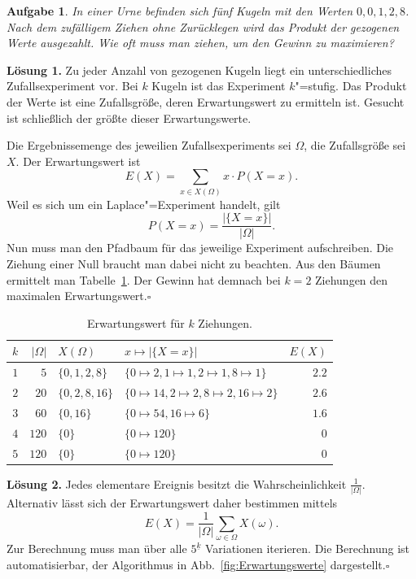 \documentclass[a4paper,10pt,fleqn,twoside]{scrartcl}
\numberwithin{equation}{section}
\newcommand{\strong}[1]{{\normalfont\sffamily\bfseries #1}}
\renewcommand{\qedsymbol}{\ensuremath{\square}}
\theoremstyle{Aufgabe}
\newtheorem{Aufgabe}{\sffamily Aufgabe}[section]
\begin{document}
\begin{Aufgabe}
In einer Urne befinden sich fünf Kugeln mit den Werten $0,0,1,2,8$.
Nach dem zufälligem Ziehen ohne Zurücklegen wird das Produkt der
gezogenen Werte ausgezahlt. Wie oft muss man ziehen, um den Gewinn zu
maximieren?
\end{Aufgabe}
\strong{Lösung 1.} Zu jeder Anzahl von gezogenen Kugeln liegt ein
unterschiedliches Zufallsexperiment vor. Bei $k$ Kugeln ist das
Experiment $k$"=stufig. Das Produkt der Werte ist eine Zufallsgröße,
deren Erwartungswert zu ermitteln ist. Gesucht ist schließlich der
größte dieser Erwartungswerte.

Die Ergebnissemenge des jeweilien Zufallsexperiments sei $\Omega$,
die Zufallsgröße sei $X$. Der Erwartungswert ist
\[E(X) = \!\!\sum_{x\in X(\Omega)}\!\! x\cdot P(X=x).\]
Weil es sich um ein Laplace"=Experiment handelt, gilt
\[P(X=x) = \frac{|\{X=x\}|}{|\Omega|}.\]
Nun muss man den Pfadbaum für das jeweilige Experiment aufschreiben.
Die Ziehung einer Null braucht man dabei nicht zu beachten.
Aus den Bäumen ermittelt man Tabelle~\ref{tab:Produkt-Gewinn}.
Der Gewinn hat demnach bei $k=2$ Ziehungen den maximalen
Erwartungswert.\;\qedsymbol
\begin{table}
\center
\begin{tabular}{rrllr}
\toprule
$k$ & $|\Omega|$ & $X(\Omega)$ & $x\mapsto |\{X=x\}|$ & $E(X)$\\
\midrule
$1$ & $5$ & $\{0,1,2,8\}$ & $\{0\mapsto 2,1\mapsto 1,2\mapsto 1,8\mapsto 1\}$ & $2.2$\\
$2$ & $20$ & $\{0,2,8,16\}$ & $\{0\mapsto 14,2\mapsto 2,8\mapsto 2,16\mapsto 2\}$ & $2.6$\\
$3$ & $60$ & $\{0,16\}$ & $\{0\mapsto 54,16\mapsto 6\}$ & $1.6$\\
$4$ & $120$ & $\{0\}$ & $\{0\mapsto 120\}$ & $0$ \\
$5$ & $120$ & $\{0\}$ & $\{0\mapsto 120\}$ & $0$\\
\bottomrule
\end{tabular}
\caption{Erwartungswert für $k$ Ziehungen.}
\label{tab:Produkt-Gewinn}
\end{table}

\strong{Lösung 2.} Jedes elementare Ereignis besitzt die
Wahrscheinlichkeit $\tfrac{1}{|\Omega|}$. Alternativ lässt sich der
Erwartungswert daher bestimmen mittels
\[E(X) = \frac{1}{|\Omega|}\sum_{\omega\in\Omega} X(\omega).\]
Zur Berechnung muss man über alle $5^{\underline k}$ Variationen
iterieren. Die Berechnung ist automatisierbar, der Algorithmus in
Abb.~\ref{fig:Erwartungswerte} dargestellt.\;\qedsymbol
\end{document}
